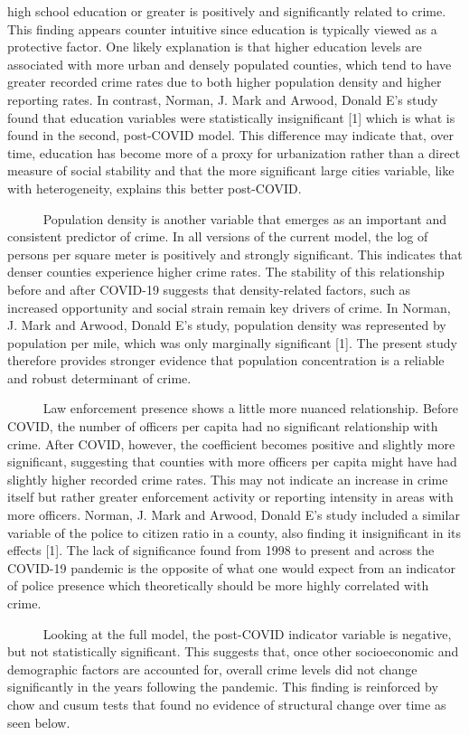 \documentclass[
  11pt,
  letterpaper,
  DIV=11,
  numbers=noendperiod]{scrartcl}
\begin{document}
high school education or greater is positively and significantly related
to crime. This finding appears counter intuitive since education is
typically viewed as a protective factor. One likely explanation is that
higher education levels are associated with more urban and densely
populated counties, which tend to have greater recorded crime rates due
to both higher population density and higher reporting rates. In
contrast, Norman, J. Mark and Arwood, Donald E's study found that
education variables were statistically insignificant {[}1{]} which is
what is found in the second, post-COVID model. This difference may
indicate that, over time, education has become more of a proxy for
urbanization rather than a direct measure of social stability and that
the more significant large cities variable, like with heterogeneity,
explains this better post-COVID.\\
\strut ~~~~~ Population density is another variable that emerges as an
important and consistent predictor of crime. In all versions of the
current model, the log of persons per square meter is positively and
strongly significant. This indicates that denser counties experience
higher crime rates. The stability of this relationship before and after
COVID-19 suggests that density-related factors, such as increased
opportunity and social strain remain key drivers of crime. In Norman, J.
Mark and Arwood, Donald E's study, population density was represented by
population per mile, which was only marginally significant {[}1{]}. The
present study therefore provides stronger evidence that population
concentration is a reliable and robust determinant of crime.\\
\strut ~~~~~ Law enforcement presence shows a little more nuanced
relationship. Before COVID, the number of officers per capita had no
significant relationship with crime. After COVID, however, the
coefficient becomes positive and slightly more significant, suggesting
that counties with more officers per capita might have had slightly
higher recorded crime rates. This may not indicate an increase in crime
itself but rather greater enforcement activity or reporting intensity in
areas with more officers. Norman, J. Mark and Arwood, Donald E's study
included a similar variable of the police to citizen ratio in a county,
also finding it insignificant in its effects {[}1{]}. The lack of
significance found from 1998 to present and across the COVID-19 pandemic
is the opposite of what one would expect from an indicator of police
presence which theoretically should be more highly correlated with
crime.\\
\strut ~~~~~ Looking at the full model, the post-COVID indicator
variable is negative, but not statistically significant. This suggests
that, once other socioeconomic and demographic factors are accounted
for, overall crime levels did not change significantly in the years
following the pandemic. This finding is reinforced by chow and cusum
tests that found no evidence of structural change over time as seen
below.
\end{document}
